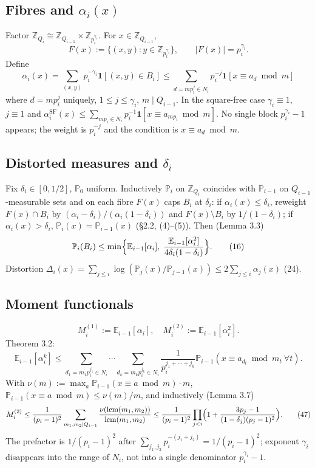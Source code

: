 \documentclass[11pt,a4paper]{article}
\theoremstyle{plain}
\theoremstyle{definition}
\theoremstyle{remark}
\newcommand{\Z}{\mathbb{Z}}
\newcommand{\PP}{\mathbb{P}}
\newcommand{\E}{\mathbb{E}}
\begin{document}
\subsection{Fibres and \texorpdfstring{$\alpha_{i}(x)$}{alpha\_i}}

Factor $\Z_{Q_{i}}\cong\Z_{Q_{i-1}}\times\Z_{p_{i}^{\gamma_{i}}}$. For $x\in\Z_{Q_{i-1}}$,
\[
F(x):=\{(x,y):y\in\Z_{p_{i}^{\gamma_{i}}}\},\qquad |F(x)|=p_{i}^{\gamma_{i}}.
\]
Define
\[
\alpha_{i}(x)=\sum_{(x,y)}p_{i}^{-\gamma_{i}}\mathbf1[(x,y)\in B_{i}]
\le\sum_{d=m p_{i}^{j}\in N_{i}}p_{i}^{-j}\mathbf1[x\equiv a_{d}\bmod m] \tag{34--35}
\]
where $d=m p_{i}^{j}$ uniquely, $1\le j\le\gamma_{i}$, $m\mid Q_{i-1}$. In the square-free case $\gamma_{i}\equiv1$, $j\equiv1$ and $\alpha_{i}^{\mathrm{SF}}(x)\le\sum_{m p_{i}\in N_{i}}p_{i}^{-1}\mathbf1[x\equiv a_{m p_{i}}\bmod m]$. No single block $p_{i}^{\gamma_{i}}-1$ appears; the weight is $p_{i}^{-j}$ and the condition is $x\equiv a_{d}\bmod m$.

\subsection{Distorted measures and \texorpdfstring{$\delta_{i}$}{delta\_i}}

Fix $\delta_{i}\in[0,1/2]$, $\PP_{0}$ uniform. Inductively $\PP_{i}$ on $\Z_{Q_{i}}$ coincides with $\PP_{i-1}$ on $Q_{i-1}$-measurable sets and on each fibre $F(x)$ caps $B_{i}$ at $\delta_{i}$: if $\alpha_{i}(x)\le\delta_{i}$, reweight $F(x)\cap B_{i}$ by $(\alpha_{i}-\delta_{i})/(\alpha_{i}(1-\delta_{i}))$ and $F(x)\setminus B_{i}$ by $1/(1-\delta_{i})$; if $\alpha_{i}(x)>\delta_{i}$, $\PP_{i}(x)=\PP_{i-1}(x)$ (\S2.2, (4)--(5)). Then (Lemma 3.3)
\[
\PP_{i}(B_{i})\le\min\Bigl\{\E_{i-1}[\alpha_{i}],\;\frac{\E_{i-1}[\alpha_{i}^{2}]}{4\delta_{i}(1-\delta_{i})}\Bigr\}. \tag{16}
\]
Distortion $\Delta_{i}(x)=\sum_{j\le i}\log(\PP_{j}(x)/\PP_{j-1}(x))\le2\sum_{j\le i}\alpha_{j}(x)$ (24).

\subsection{Moment functionals}

\[
M_{i}^{(1)}:=\E_{i-1}[\alpha_{i}],\quad M_{i}^{(2)}:=\E_{i-1}[\alpha_{i}^{2}]. \tag{13}
\]
Theorem 3.2:
\[
\E_{i-1}[\alpha_{i}^{k}]\le\sum_{d_{1}=m_{1}p_{i}^{j_{1}}\in N_{i}}\!\!\cdots\!\!\sum_{d_{k}=m_{k}p_{i}^{j_{k}}\in N_{i}}\frac{1}{p_{i}^{j_{1}+\cdots+j_{k}}}\PP_{i-1}(x\equiv a_{d_{t}}\bmod m_{t}\ \forall t). \tag{36}
\]
With $\nu(m):=\max_{a}\PP_{i-1}(x\equiv a\bmod m)\cdot m$, $\PP_{i-1}(x\equiv a\bmod m)\le\nu(m)/m$, and inductively (Lemma 3.7)
\[
M_{i}^{(2)}\le\frac{1}{(p_{i}-1)^{2}}\sum_{m_{1},m_{2}\mid Q_{i-1}}\frac{\nu(\operatorname{lcm}(m_{1},m_{2}))}{\operatorname{lcm}(m_{1},m_{2})}
\le\frac{1}{(p_{i}-1)^{2}}\prod_{j<i}\Bigl(1+\frac{3p_{j}-1}{(1-\delta_{j})(p_{j}-1)^{2}}\Bigr). \tag{47}
\]
The prefactor is $1/(p_{i}-1)^{2}$ after $\sum_{j_{1},j_{2}}p_{i}^{-(j_{1}+j_{2})}=1/(p_{i}-1)^{2}$; exponent $\gamma_{i}$ disappears into the range of $N_{i}$, not into a single denominator $p_{i}^{\gamma_{i}}-1$.
\end{document}
